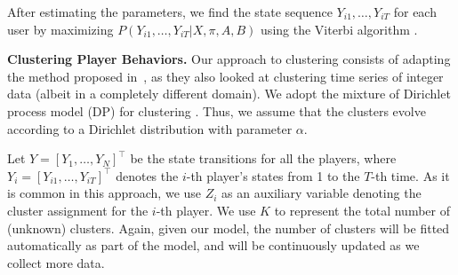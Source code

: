  
After estimating the parameters, we find the state sequence $Y_{i1}, \ldots, Y_{iT}$  
for each user by maximizing $P(Y_{i1}, \ldots, Y_{iT}| X, \pi, A, B)$ using the  Viterbi  algorithm \cite{hmm}. 

{\bf Clustering Player Behaviors.}
 Our  approach to clustering consists of  adapting the method proposed in~\cite{moises}, as they also looked at clustering time series of integer data (albeit in a completely different domain). We adopt the mixture of Dirichlet process model (DP) for clustering \cite{dpclustering}.  Thus, we assume that the clusters evolve according to a Dirichlet distribution with parameter $\alpha$.

Let $Y = [Y_1, \ldots, Y_N]^\top$ be the state transitions for all the players,
where $Y_i = [Y_{i1}, \ldots, Y_{iT}]^\top$ denotes the $i$-th player's states from 1 to
the $T$-th time. As it is common in this approach, we use $Z_i$ as an auxiliary variable denoting the  cluster assignment for the $i$-th player.  We use  $K$ to represent the total number of (unknown) clusters.  Again, given our model, the number of clusters will be fitted automatically as part of the model, and will be continuously updated as we collect more data. 



